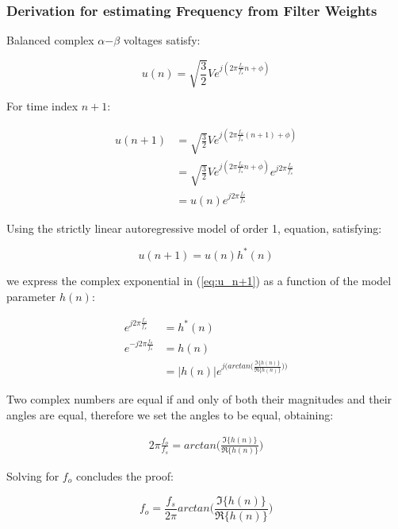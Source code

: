 \documentclass[12pt]{article}
\begin{document}
		\subsubsection{Derivation for estimating Frequency from Filter Weights}
			Balanced complex $\alpha$$-$$\beta$ voltages satisfy:
			
			\begin{equation}
			u(n) = \sqrt{\frac{3}{2}} V e^{j(2\pi \frac{f_{o}}{f_{s}} n + \phi)}
			\end{equation}
			
			For time index $n+1$:
			
			\begin{align}
			u(n+1)  &= \sqrt{\frac{3}{2}} V e^{j(2\pi \frac{f_{o}}{f_{s}} (n+1) + \phi)} \\
			&= \sqrt{\frac{3}{2}} V e^{j(2\pi \frac{f_{o}}{f_{s}} n + \phi)} e^{j 2 \pi \frac{f_{o}}{f_{s}}} \\
			&= u(n) e^{j 2 \pi \frac{f_{o}}{f_{s}}}
			\label{eq:u_n+1}
			\end{align}
			
			Using the strictly linear autoregressive model of order 1, equation, satisfying:
			
			\begin{equation}
			u(n+1) = u(n) h^{*}(n)
			\end{equation}
			
			we express the complex exponential in (\ref{eq:u_n+1}) as a function of the model parameter $h(n)$:
			
			\begin{align}
			e^{j 2 \pi \frac{f_{o}}{f_{s}}} &= h^{*}(n) \\
			e^{-j 2 \pi \frac{f_{o}}{f_{s}}}&= h(n) \\
			&= | h(n) | e^{j\big( arctan \big(\frac{\Im\{h(n)\}}{\Re\{h(n)\}} \big) \big)}
			\end{align}
			
			Two complex numbers are equal if and only of both their magnitudes and their angles are equal, therefore we set the angles to be equal, obtaining:
			
			\begin{align}
			2 \pi \frac{f_{o}}{f_{s}} = arctan \big(\frac{\Im\{h(n)\}}{\Re\{h(n)\}} \big) 
			\end{align}
			
			Solving for $f_{o}$ concludes the proof:
			
			\begin{equation}
			f_{o} = \frac{f_{s}}{2\pi} arctan \big(\frac{\Im\{h(n)\}}{\Re\{h(n)\}} \big)
			\label{proof:fo_CLMS}
			\end{equation}
			
\end{document}

